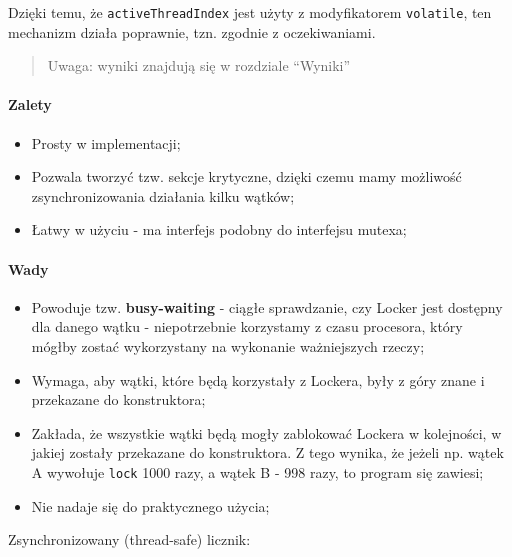 \documentclass[11pt]{article}
\providecommand{\tightlist}{%
      \setlength{\itemsep}{0pt}\setlength{\parskip}{0pt}}
\begin{document}
Dzięki temu, że \texttt{activeThreadIndex} jest użyty z modyfikatorem
\texttt{volatile}, ten mechanizm działa poprawnie, tzn. zgodnie z
oczekiwaniami.

\begin{quote}
Uwaga: wyniki znajdują się w rozdziale ``Wyniki''
\end{quote}

\hypertarget{zalety}{%
\paragraph{Zalety}\label{zalety}}

\begin{itemize}
\tightlist
\item
  Prosty w implementacji;
\item
  Pozwala tworzyć tzw. sekcje krytyczne, dzięki czemu mamy możliwość
  zsynchronizowania działania kilku wątków;
\item
  Łatwy w użyciu - ma interfejs podobny do interfejsu mutexa;
\end{itemize}

\hypertarget{wady}{%
\paragraph{Wady}\label{wady}}

\begin{itemize}
\tightlist
\item
  Powoduje tzw. \textbf{busy-waiting} - ciągłe sprawdzanie, czy Locker
  jest dostępny dla danego wątku - niepotrzebnie korzystamy z czasu
  procesora, który mógłby zostać wykorzystany na wykonanie ważniejszych
  rzeczy;
\item
  Wymaga, aby wątki, które będą korzystały z Lockera, były z góry znane
  i przekazane do konstruktora;
\item
  Zakłada, że wszystkie wątki będą mogły zablokować Lockera w
  kolejności, w jakiej zostały przekazane do konstruktora. Z tego
  wynika, że jeżeli np. wątek A wywołuje \texttt{lock} 1000 razy, a
  wątek B - 998 razy, to program się zawiesi;
\item
  Nie nadaje się do praktycznego użycia;
\end{itemize}

Zsynchronizowany (thread-safe) licznik:
\end{document}

